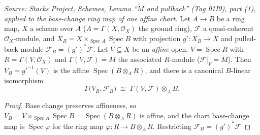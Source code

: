 \begin{lemma}
  \label{lem:base_change_chart_tensor_iso}
  \textit{Source: Stacks Project, Schemes, Lemma ``\(\widetilde M\) and pullback''
  (Tag 01I9), part (1), applied to the base-change ring map of one affine chart.}
  Let \(A \to B\) be a ring map, \(X\) a scheme over \(A\) (\(A = \Gamma(X,\mathcal{O}_X)\)
  the ground ring), \(\mathcal{F}\) a quasi-coherent \(\mathcal{O}_X\)-module, and
  \(X_B = X \times_{\operatorname{Spec} A}\operatorname{Spec} B\) with projection
  \(g' : X_B \to X\) and pulled-back module \(\mathcal{F}_B = (g')^{*}\mathcal{F}\). Let
  \(V \subseteq X\) be an \emph{affine} open, \(V = \operatorname{Spec} R\) with
  \(R = \Gamma(V,\mathcal{O}_X)\) and \(\Gamma(V,\mathcal{F}) = M\) the associated
  \(R\)-module (\(\mathcal{F}|_V = \widetilde M\)). Then \(V_B = g'^{-1}(V)\) is the affine
  \(\operatorname{Spec}(B \otimes_A R)\), and there is a canonical \(B\)-linear isomorphism
  \[
    \Gamma\bigl(V_B, \mathcal{F}_B\bigr)
    \;\cong\;
    \Gamma(V,\mathcal{F}) \otimes_A B .
  \]
  \begin{proof}
    Base change preserves affineness, so \(V_B = V \times_{\operatorname{Spec} A}
    \operatorname{Spec} B = \operatorname{Spec}(B \otimes_A R)\) is affine, and the chart
    base-change map is \(\operatorname{Spec}\varphi\) for the ring map
    \(\varphi : R \to B \otimes_A R\). Restricting \(\mathcal{F}_B = (g')^{*}\mathcal{F}\)

\end{proof}
\end{lemma}
